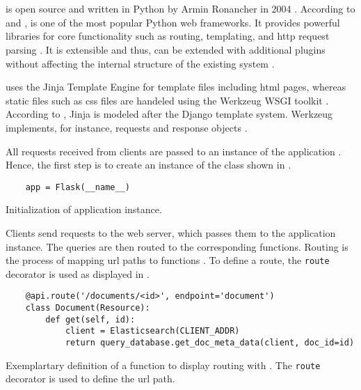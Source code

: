 \section{\flask{}}\label{sec:BE_flask}

\flask{} is open source and written in Python by Armin Ronancher in 2004 \cite{flask2015, mvc_flask2019}.
According to \citeauthor{flask_book2015} and \citeauthor{mvc_flask2019}, \flask{} is one of the most popular Python web frameworks.
It provides powerful libraries for core functionality such as routing, templating, and \ac{http} request parsing \cite{flask_book2015}.
It is extensible and thus, can be extended with additional plugins without affecting the internal structure of the existing system \cite{flask2015}.

\flask{} uses the Jinja Template Engine for template files including \ac{html} pages,
whereas static files such as \ac{css} files are handeled using the Werkzeug WSGI toolkit \cite{flask2015}.
According to \citeauthor{flask2015}, Jinja is modeled after the Django template system.
Werkzeug implements, for instance, requests and response objects \cite{mvc_flask2019}.

All requests received from clients are passed to an instance of the \flask{} application \cite{flask_book2018}.
Hence, the first step is to create an instance of the \flask{} class shown in .

\begin{listing}[htp]
    \begin{verbatim}
    app = Flask(__name__)
    \end{verbatim}
    \caption[Initialization of a \flask{} application instance]{Initialization of \flask{} application instance.
    }
    \label{lst:flask_app_init}
\end{listing}

Clients send requests to the web server, which passes them to the \flask{} application instance.
The queries are then routed to the corresponding functions.
Routing is the process of mapping \ac{url} paths to functions \cite{flask_book2018}.
To define a route, the \texttt{route} decorator is used as displayed in .

\begin{listing}[htp]
    \begin{verbatim}
    @api.route('/documents/<id>', endpoint='document')
    class Document(Resource):
        def get(self, id):
            client = Elasticsearch(CLIENT_ADDR)
            return query_database.get_doc_meta_data(client, doc_id=id)
    \end{verbatim}
    \caption[Routing using \flask{}]{Exemplartary definition of a function to display routing with \flask{}.
    The \texttt{route} decorator is used to define the \ac{url} path.
    }
    \label{lst:flask_routing}
\end{listing}

